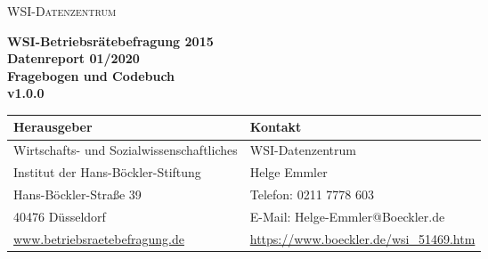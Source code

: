 \begin{titlepage}
\begin{center}
\vspace*{7.0cm}
\textsc{WSI-Datenzentrum} \\ 
\vspace*{2.0cm}

		\textbf{\LARGE WSI-Betriebsrätebefragung 2015}\\
\vspace*{1cm}
		\textbf{\large Datenreport 01/2020} \\ 
		\vspace*{0.175cm} \textbf{\large Fragebogen und Codebuch} \\
		\vspace*{0.175cm} \textbf{\large v1.0.0} \\
 
\vspace{3cm}
	
		

\end{center}		

\newpage

\thispagestyle{empty}

\vspace*{\fill}
\begin{tabular}[b]{L{9cm}  L{7.5cm}   }
\textbf{Herausgeber} & \textbf{Kontakt} \\
\toprule
Wirtschafts- und Sozialwissenschaftliches  & WSI-Datenzentrum  \\
 Institut der Hans-Böckler-Stiftung & Helge Emmler \\ 
 	Hans-Böckler-Straße 39  & Telefon: 0211 7778 603  \\
		40476 Düsseldorf  & E-Mail: Helge-Emmler@Boeckler.de \\
		\url{www.betriebsraetebefragung.de}& \url{https://www.boeckler.de/wsi_51469.htm}\\
\end{tabular}
		
					

\end{titlepage}